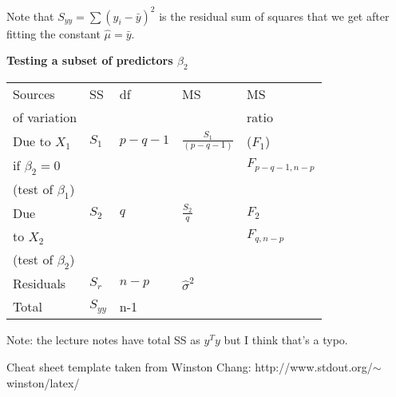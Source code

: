 \documentclass[10pt,landscape]{article}
\begin{document}
\begin{multicols}{3}
Note that $S_{yy}=\sum (y_i - \bar{y})^2$ is the residual sum of squares that we get after fitting the constant $\hat{\mu}=\bar{y}$.

\medskip
\textbf{Testing a subset of predictors $\beta_2$}

\begin{tabular}{|l|l|l|l|l|}
\hline
Sources & SS & df & MS & MS \\
of variation  & & & & ratio \\
\hline
Due to $X_1$   & $S_1$ & $p-q-1$ & $\frac{S_1}{(p-q-1)}$ & ($F_1$) \\
if $\beta_2=0$ & & & & $F_{p-q-1,n-p}$\\
(test of $\beta_1$) & & & & \\
\hline
Due & $S_2$ & $q$ & $\frac{S_2}{q}$ & $F_2$\\
 to $X_2$ & & & &  $F_{q,n-p}$\\
(test of $\beta_2$) & & & & \\
\hline
Residuals   & $S_r$ & $n-p$ & $\hat{\sigma}^2$ & \\
\hline
Total        & $S_{yy}$  & n-1 &  &\\
\hline
\end{tabular}
Note: the lecture notes have total SS as $y^T y$ but I think that's a typo.








Cheat sheet template taken from Winston Chang: http://www.stdout.org/$\sim$winston/latex/



\end{multicols}
\end{document}
